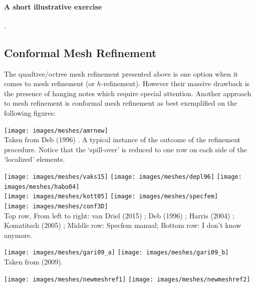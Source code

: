 \newpage
\paragraph{A short illustrative exercise}.




\subsection{Conformal Mesh Refinement \label{ss:cmr}}

The quadtree/octree mesh refinement presented above is one option
when it comes to mesh refinement (or $h$-refinement). However their 
massive drawback is the presence of hanging notes which require 
special attention. 
Another approach to mesh refinement is conformal mesh refinement
as best exemplified on the following figures: 

\begin{center}
\texttt{[image: images/meshes/amrnew]}\\
{\captionfont Taken from Deb \etal (1996) \cite{depl96}.
A typical instance of the outcome of the refinement procedure. 
Notice that the `spill-over' is reduced to one row on each side of the `localized' elements.}
\end{center}

\begin{center}
\texttt{[image: images/meshes/vaks15]}
\texttt{[image: images/meshes/depl96]}
\texttt{[image: images/meshes/habo04]}\\
\texttt{[image: images/meshes/kott05]}
\texttt{[image: images/meshes/specfem]}\\
\texttt{[image: images/meshes/conf3D]}\\
{\captionfont 
Top row, From left to right: 
van Driel \etal (2015) \cite{vaks15}; 
Deb \etal (1996) \cite{depl96}; 
Harris \etal (2004) \cite{habo04}; 
Komatitsch \etal (2005) \cite{kott05}; 
Middle row: Specfem manual;
Bottom row: I don't know anymore.}
\end{center}

\begin{center}
\texttt{[image: images/meshes/gari09\_a]}
\texttt{[image: images/meshes/gari09\_b]}\\
{\captionfont Taken from \textcite{gari09} (2009).}
\end{center}

\begin{center}
\texttt{[image: images/meshes/newmeshref1]}
\texttt{[image: images/meshes/newmeshref2]}
\end{center}


